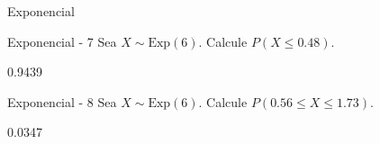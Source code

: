 \documentclass[a4,11pt]{aleph-notas}
\newcommand{\Exp}{\text{Exp}}
\begin{document}
\begin{quiz}{Exponencial}
\begin{numerical}[tolerance=0.01]%
    {Exponencial - 7}
    Sea \( X \sim \Exp(6) \). Calcule \( P(X \leq 0.48) \).
    \item[] 0.9439
\end{numerical}

\begin{numerical}[tolerance=0.01]%
    {Exponencial - 8}
    Sea \( X \sim \Exp(6) \). Calcule \( P(0.56 \leq X \leq 1.73) \).
    \item[] 0.0347
\end{numerical}




\end{quiz}
\end{document}
